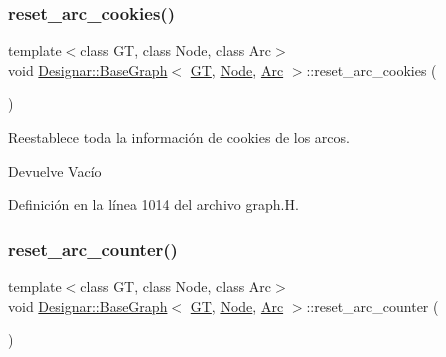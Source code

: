 \subsubsection{\texorpdfstring{reset\+\_\+arc\+\_\+cookies()}{reset\_arc\_cookies()}}
{\footnotesize\ttfamily template$<$class GT, class Node, class Arc$>$ \\
void \hyperlink{class_designar_1_1_base_graph}{Designar\+::\+Base\+Graph}$<$ \hyperlink{demo-buildgraph_8_c_a3001c40d2c31ca87ed96cd7d1334a55e}{GT}, \hyperlink{namespace_designar_a5af326c65aa2bd26b26c410f2030d09e}{Node}, \hyperlink{namespace_designar_a3f55fb5513d62ff47cbc8f72b8e95d6f}{Arc} $>$\+::reset\+\_\+arc\+\_\+cookies (\begin{DoxyParamCaption}{ }\end{DoxyParamCaption})\hspace{0.3cm}{\ttfamily [inline]}}



Reestablece toda la información de cookies de los arcos. 

\begin{DoxyReturn}{Devuelve}
Vacío 
\end{DoxyReturn}


Definición en la línea 1014 del archivo graph.\+H.

\mbox{\label{class_designar_1_1_base_graph_a8b22e29aa37006fab9c219de86660bdd}} 
\subsubsection{\texorpdfstring{reset\+\_\+arc\+\_\+counter()}{reset\_arc\_counter()}}
{\footnotesize\ttfamily template$<$class GT, class Node, class Arc$>$ \\
void \hyperlink{class_designar_1_1_base_graph}{Designar\+::\+Base\+Graph}$<$ \hyperlink{demo-buildgraph_8_c_a3001c40d2c31ca87ed96cd7d1334a55e}{GT}, \hyperlink{namespace_designar_a5af326c65aa2bd26b26c410f2030d09e}{Node}, \hyperlink{namespace_designar_a3f55fb5513d62ff47cbc8f72b8e95d6f}{Arc} $>$\+::reset\+\_\+arc\+\_\+counter (\begin{DoxyParamCaption}{ }\end{DoxyParamCaption})\hspace{0.3cm}{\ttfamily [inline]}}



